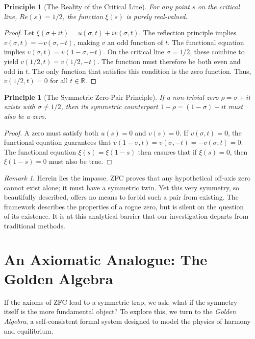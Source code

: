 \documentclass{article}
\theoremstyle{plain}
\newtheorem{principle}[theorem]{Principle}
\theoremstyle{definition}
\theoremstyle{remark}
\newtheorem*{remark}{Remark}
\begin{document}
\begin{principle}[The Reality of the Critical Line]
For any point $s$ on the critical line, $Re(s)=1/2$, the function $\xi(s)$ is purely real-valued.
\end{principle}
\begin{proof}
Let $\xi(\sigma+it) = u(\sigma,t) + iv(\sigma,t)$. The reflection principle implies $v(\sigma,t) = -v(\sigma,-t)$, making $v$ an odd function of $t$. The functional equation implies $v(\sigma,t) = v(1-\sigma,-t)$. On the critical line $\sigma=1/2$, these combine to yield $v(1/2, t) = v(1/2, -t)$. The function must therefore be both even and odd in $t$. The only function that satisfies this condition is the zero function. Thus, $v(1/2, t) = 0$ for all $t \in \mathbb{R}$.
\end{proof}

\begin{principle}[The Symmetric Zero-Pair Principle]
If a non-trivial zero $\rho = \sigma + it$ exists with $\sigma \neq 1/2$, then its symmetric counterpart $1-\rho = (1-\sigma)+it$ must also be a zero.
\end{principle}
\begin{proof}
A zero must satisfy both $u(s)=0$ and $v(s)=0$. If $v(\sigma,t)=0$, the functional equation guarantees that $v(1-\sigma, t) = v(\sigma, -t) = -v(\sigma,t) = 0$. The functional equation $\xi(s) = \xi(1-s)$ then ensures that if $\xi(s)=0$, then $\xi(1-s)=0$ must also be true.
\end{proof}

\begin{remark}
Herein lies the impasse. ZFC proves that any hypothetical off-axis zero cannot exist alone; it must have a symmetric twin. Yet this very symmetry, so beautifully described, offers no means to forbid such a pair from existing. The framework describes the properties of a rogue zero, but is silent on the question of its existence. It is at this analytical barrier that our investigation departs from traditional methods.
\end{remark}

\section{An Axiomatic Analogue: The Golden Algebra}
\label{sec:algebra}

If the axioms of ZFC lead to a symmetric trap, we ask: what if the symmetry itself is the more fundamental object? To explore this, we turn to the \textit{Golden Algebra}, a self-consistent formal system designed to model the physics of harmony and equilibrium.
\end{document}
